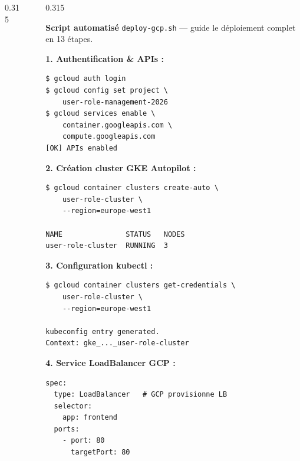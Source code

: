 \documentclass[final]{beamer}
\newcommand{\colsep}{%
  \hspace{12pt}\textcolor{navy!20}{\rule{1.2pt}{0.88\textheight}}\hspace{12pt}%
}
\begin{document}
\begin{frame}[t]{}
\begin{columns}[t]
\begin{column}{0.315\linewidth}
\begin{tcolorbox}[sectionbox, title={\faServer\quad Orchestration Kubernetes}]
\end{tcolorbox}

\end{column}
\colsep

\begin{column}{0.315\linewidth}

\begin{tcolorbox}[sectionbox, title={\faCloud\quad Déploiement sur GCP}]

\textbf{Script automatisé} \texttt{deploy-gcp.sh} — guide le déploiement complet en 13 étapes.

\vspace{8pt}
\textbf{1. Authentification \& APIs :}
\begin{tcolorbox}[codebox]
\begin{lstlisting}
$ gcloud auth login
$ gcloud config set project \
    user-role-management-2026
$ gcloud services enable \
    container.googleapis.com \
    compute.googleapis.com
[OK] APIs enabled
\end{lstlisting}
\end{tcolorbox}

\vspace{6pt}
\textbf{2. Création cluster GKE Autopilot :}
\begin{tcolorbox}[codebox]
\begin{lstlisting}
$ gcloud container clusters create-auto \
    user-role-cluster \
    --region=europe-west1

NAME               STATUS   NODES
user-role-cluster  RUNNING  3
\end{lstlisting}
\end{tcolorbox}

\vspace{6pt}
\textbf{3. Configuration kubectl :}
\begin{tcolorbox}[codebox]
\begin{lstlisting}
$ gcloud container clusters get-credentials \
    user-role-cluster \
    --region=europe-west1

kubeconfig entry generated.
Context: gke_..._user-role-cluster
\end{lstlisting}
\end{tcolorbox}

\vspace{6pt}
\textbf{4. Service LoadBalancer GCP :}
\begin{tcolorbox}[codebox]
\begin{lstlisting}
spec:
  type: LoadBalancer   # GCP provisionne LB
  selector:
    app: frontend
  ports:
    - port: 80
      targetPort: 80


\end{lstlisting}
\end{tcolorbox}
\end{tcolorbox}
\end{column}
\end{columns}
\end{frame}
\end{document}
